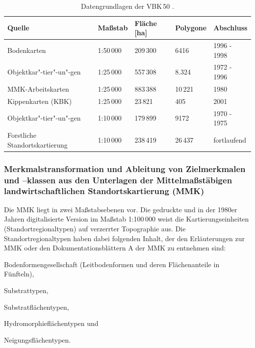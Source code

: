 \begin{table}[t]

  \caption[Datengrundlagen der VBK\,50.]{Datengrundlagen der VBK\,50 \citep{Hartmann2014}.}\label{tab:datengrundlagen}
	\vspace*{6pt}
     \centering \begin{tabularx}{\textwidth}{X|X|X|X|X}
    \toprule
    \textbf{Quelle} & \textbf{Maßstab} & \textbf{Fläche} [ha] & \textbf{Polygone} & \textbf{Abschluss} \\\midrule
    Bodenkarten & 1:50\,000 & 209\,300 & 6416 & 1996 - 1998 \\\midrule
    Objektkar"-tier"-un"-gen  & 1:25\,000 & 557\,308 & 8.324 & 1972 - 1996 \\\midrule
    MMK-Arbeitskarten & 1:25\,000 & 883\,388 & 10\,221 & 1980 \\\midrule
    Kippenkarten (KBK) & 1:25\,000 & 23\,821 & 405   & 2001 \\\midrule
    Objektkar"-tier"-un"-gen  & 1:10\,000 & 179\,899 & 9172 & 1970 - 1975 \\\midrule
    Forstliche Standortskartierung & 1:10\,000 & 238\,419 & 26\,437 & fortlaufend \\
    \bottomrule
    \end{tabularx}%
  \label{tab:addlabel}%
\end{table}%

\subsubsection{Merkmalstransformation und Ableitung von Zielmerkmalen und –klassen aus den Unterlagen der Mittelmaßstäbigen landwirtschaftlichen Standortskartierung (MMK)}\label{sec:trans-mmk}
Die MMK liegt in zwei Maßstabsebenen vor. Die gedruckte und in der 1980er Jahren digitalisierte Version im Maßstab 1:100\,000 weist die Kartierungseinheiten (Standortregionaltypen) auf verzerrter Topographie aus. Die Standortregionaltypen haben dabei folgenden Inhalt, der den Erläuterungen zur MMK \citep{SchmidtDiemann1981} oder den Dokumentationsblättern A der MMK zu entnehmen sind: 

\begin{compactitem}
	\item Bodenformengesellschaft (Leitbodenformen und deren Flächenanteile in Fünfteln),
	\item Substrattypen,
	\item Substratflächentypen,
	\item Hydromorphieflächentypen und 
	\item Neigungsflächentypen. 
\end{compactitem}

